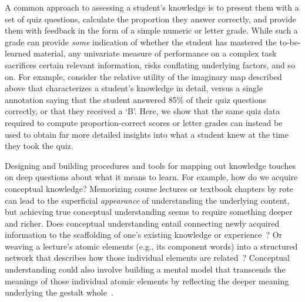 \documentclass[10pt]{article}
\begin{document}
A common approach to assessing a student's knowledge is to present them with a set of quiz
questions, calculate the proportion they answer correctly, and provide
them with feedback in the form of a simple numeric or letter grade. While such a
grade can provide \textit{some} indication of whether the student has
mastered the to-be-learned material, any univariate measure of performance on a
complex task sacrifices certain relevant information, risks conflating underlying
factors, and so on. For example, consider the relative utility of the
imaginary map described above that characterizes a student's knowledge
in detail, versus a single annotation saying that the student answered 85\% of
their quiz questions correctly, or that they received a `B'. Here, we show that
the same quiz data required to compute proportion-correct scores or letter
grades can instead be used to obtain far more detailed insights into what a
student knew at the time they took the quiz.

Designing and building procedures and tools for mapping out knowledge touches
on deep questions about what it means to learn. For example, how do we acquire
conceptual knowledge? Memorizing course lectures or textbook chapters by rote
can lead to the superficial \textit{appearance} of understanding the underlying
content, but achieving true conceptual understanding seems to require something
deeper and richer. Does conceptual understanding entail connecting newly
acquired information to the scaffolding of one's existing knowledge or
experience~\citep{BlayEtal06,CaraMaho03, ConsEtal16, DeacEtal04, SimoEtal04}?
Or weaving a lecture's atomic elements (e.g., its component words) into a
structured network that describes how those individual elements are
related~\citep{LeeChen22}? Conceptual understanding could also involve building
a mental model that transcends the meanings of those individual atomic elements
by reflecting the deeper meaning underlying the gestalt whole~\citep{Kint70,
Macl05, ScotEtal07}.
\end{document}
